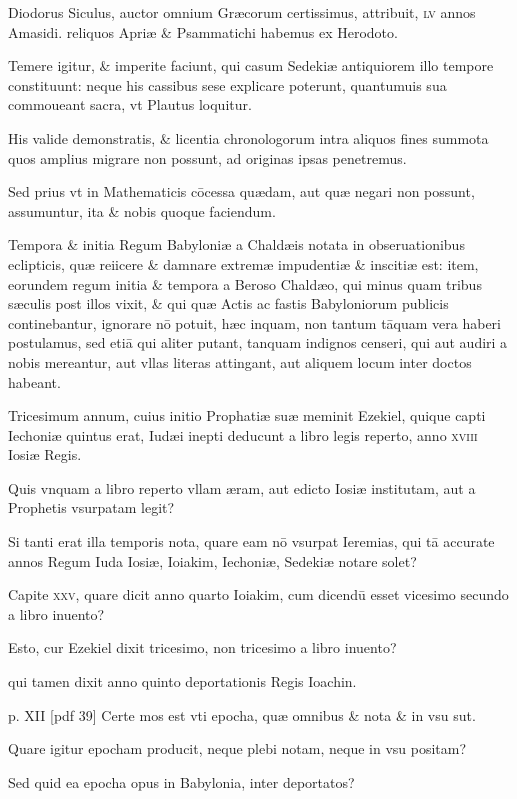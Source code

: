 \begin{parnumbers}
Diodorus Siculus,
auctor omnium Græcorum certissimus, attribuit, \textsc{lv} annos Amasidi. reliquos Apriæ \& Psammatichi habemus ex Herodoto.

Temere igitur, \& imperite faciunt, qui casum Sedekiæ antiquiorem illo tempore constituunt: neque his cassibus sese explicare poterunt,
quantumuis sua commoueant sacra, vt Plautus loquitur.

His valide
demonstratis, \& licentia chronologorum intra aliquos fines summota
quos amplius migrare non possunt, ad originas ipsas penetremus.

Sed prius vt in Mathematicis cōcessa quædam, aut quæ negari
non possunt, assumuntur, ita \& nobis quoque faciendum.

Tempora \& initia Regum Babyloniæ a Chaldæis notata in obseruationibus
eclipticis, quæ reiicere \& damnare extremæ impudentiæ \&
inscitiæ est: item, eorundem regum initia \& tempora a Beroso Chaldæo,
qui minus quam tribus sæculis post illos vixit, \& qui quæ Actis
ac fastis Babyloniorum publicis continebantur, ignorare nō potuit,
hæc inquam, non tantum tāquam vera haberi postulamus, sed etiā
qui aliter putant, tanquam indignos censeri, qui aut audiri a nobis
mereantur, aut vllas literas attingant, aut aliquem locum inter
doctos habeant.

Tricesimum annum, cuius initio Prophatiæ suæ
meminit Ezekiel, quique capti Iechoniæ quintus erat, Iudæi inepti
deducunt a libro legis reperto, anno \textsc{xviii} Iosiæ Regis.

Quis vnquam a libro reperto vllam æram, aut edicto Iosiæ institutam, aut a
Prophetis vsurpatam legit?

Si tanti erat illa temporis nota, quare
eam nō vsurpat Ieremias, qui tā accurate annos Regum Iuda Iosiæ,
Ioiakim, Iechoniæ, Sedekiæ notare solet?

Capite \textsc{xxv}, quare dicit
anno quarto Ioiakim, cum dicendū esset vicesimo secundo a libro
inuento?

Esto, cur Ezekiel dixit tricesimo, non tricesimo a libro inuento?

qui tamen dixit anno quinto deportationis Regis Ioachin.

\clearpage
p. XII [pdf 39]
Certe mos est vti epocha, quæ omnibus \& nota \& in vsu sut.

Quare
igitur epocham producit, neque plebi notam, neque in vsu positam?

Sed quid ea epocha opus in Babylonia, inter deportatos?


\end{parnumbers}
